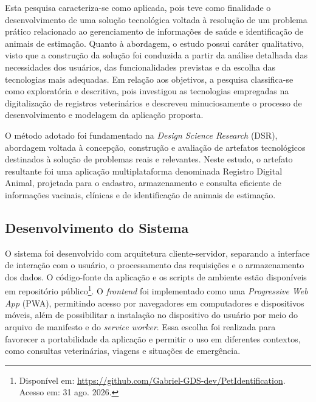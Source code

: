 \documentclass{UNESC}
\begin{document}
Esta pesquisa caracteriza-se como aplicada, pois teve como finalidade o desenvolvimento de uma solução tecnológica voltada à resolução de um problema prático relacionado ao gerenciamento de informações de saúde e identificação de animais de estimação. Quanto à abordagem, o estudo possui caráter qualitativo, visto que a construção da solução foi conduzida a partir da análise detalhada das necessidades dos usuários, das funcionalidades previstas e da escolha das tecnologias mais adequadas. Em relação aos objetivos, a pesquisa classifica-se como exploratória e descritiva, pois investigou as tecnologias empregadas na digitalização de registros veterinários e descreveu minuciosamente o processo de desenvolvimento e modelagem da aplicação proposta.

O método adotado foi fundamentado na \textit{Design Science Research} (DSR), abordagem voltada à concepção, construção e avaliação de artefatos tecnológicos destinados à solução de problemas reais e relevantes. Neste estudo, o artefato resultante foi uma aplicação multiplataforma denominada Registro Digital Animal, projetada para o cadastro, armazenamento e consulta eficiente de informações vacinais, clínicas e de identificação de animais de estimação.

\subsection{Desenvolvimento do Sistema}

O sistema foi desenvolvido com arquitetura cliente-servidor, separando a interface de interação com o usuário, o processamento das requisições e o armazenamento dos dados. O código-fonte da aplicação e os scripts de ambiente estão disponíveis em repositório público\footnote{Disponível em: \url{https://github.com/Gabriel-GDS-dev/PetIdentification}. Acesso em: 31 ago. 2026.}. O \textit{frontend} foi implementado como uma \textit{Progressive Web App} (PWA), permitindo acesso por navegadores em computadores e dispositivos móveis, além de possibilitar a instalação no dispositivo do usuário por meio do arquivo de manifesto e do \textit{service worker}. Essa escolha foi realizada para favorecer a portabilidade da aplicação e permitir o uso em diferentes contextos, como consultas veterinárias, viagens e situações de emergência.
\end{document}
